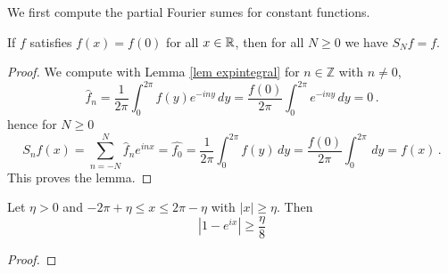 We first compute the partial Fourier sumes for constant functions.


\begin{lemma}\label{constant}
If $f$ satisfies $f(x)=f(0)$ for all $x\in \mathbb{R}$, then for all $N\ge 0$ we have $S_Nf=f$.
    \end{lemma}
\begin{proof}
    We compute with Lemma \ref{lem expintegral} for $n\in \mathbb{Z}$ with $n\neq 0$,
    \begin{equation}
        \widehat{f}_n=\frac 1{2\pi}\int_0^{2\pi}f(y)e^{-iny}\, dy=\frac {f(0)}{2\pi}\int_0^{2\pi}e^{-iny}\, dy=0\, .
    \end{equation}
hence for $N\ge 0$
\begin{equation}
    S_nf(x)=\sum_{n=-N}^N \widehat{f}_n e^{inx}=\widehat{f_0}=\frac{1}{2\pi}\int_0^{2\pi}f(y)\, dy
    =\frac{f(0)}{2\pi}\int_0^{2\pi}\, dy=f(x)\, .
\end{equation}
This proves the lemma.
\end{proof}
\begin{lemma}\label{expbound}
Let $\eta>0$ and $-2\pi +\eta \le  x\le 2\pi-\eta$ with $|x|\ge \eta$. Then
\begin{equation}
    |1-e^{ix}|\ge \frac {\eta}8
\end{equation}
\end{lemma}
\begin{proof}
    \end{proof}

